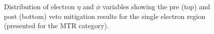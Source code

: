 \begin{figure}[htbp]
{    }
  \caption{Distribution of electron $\eta$ and $\phi$ variables showing the pre (top) and post (bottom) veto mitigation results for the single electron region (presented for the MTR category).}
  \label{fig:2018_Wenu_HEM}
\end{figure}





